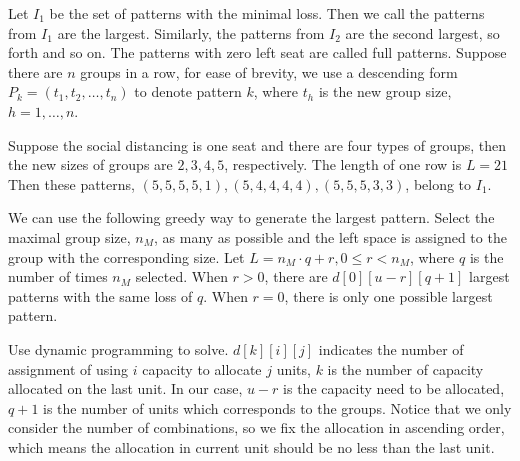 Let $I_1$ be the set of patterns with the minimal loss. Then we call the patterns from $I_1$ are the largest. Similarly, the patterns from $I_2$ are the second largest, so forth and so on. The patterns with zero left seat are called full patterns. Suppose there are $n$ groups in a row, for ease of brevity, we use a descending form $P_{k} = (t_1, t_2, \ldots, t_n)$ to denote pattern $k$, where $t_h$ is the new group size, $h = 1,\ldots, n$.


\begin{example}
  Suppose the social distancing is one seat and there are four types of groups, then the new sizes of groups are $2, 3, 4, 5$, respectively. The length of one row is $L = 21$  Then these patterns, $(5, 5, 5, 5, 1), (5, 4, 4, 4, 4),(5, 5, 5, 3, 3)$, belong to $I_1$. 
\end{example}



We can use the following greedy way to generate the largest pattern. Select the maximal group size, $n_M$, as many as possible and the left space is assigned to the group with the corresponding size. Let $L = n_M \cdot q + r, 0 \leq r < n_M$, where $q$ is the number of times $n_M$ selected. When $r>0$, there are $d[0][u-r][q+1]$ largest patterns with the same loss of $q$. When $r =0$, there is only one possible largest pattern.


Use dynamic programming to solve. $d[k][i][j]$ indicates the number of assignment of using $i$ capacity to allocate $j$ units, $k$ is the number of capacity allocated on the last unit. In our case, $u-r$ is the capacity need to be allocated, $q+1$ is the number of units which corresponds to the groups. Notice that we only consider the number of combinations, so we fix the allocation in ascending order, which means the allocation in current unit should be no less than the last unit.  

